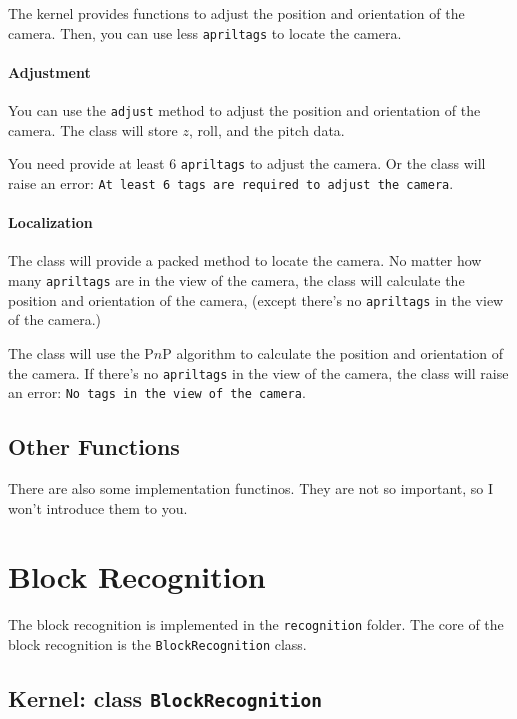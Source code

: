 \documentclass{article}
\begin{document}
The kernel provides functions to adjust the position and orientation of the camera. Then, you can use less \texttt{apriltags} to locate the camera.

\paragraph{Adjustment}

You can use the \texttt{adjust} method to adjust the position and orientation of the camera. The class will store $z$, $\mathrm{roll}$, and the $\mathrm{pitch}$ data.

You need provide at least $6$ \texttt{apriltags} to adjust the camera. Or the class will raise an error: \texttt{At least 6 tags are required to adjust the camera}.

\paragraph{Localization}

The class will provide a packed method to locate the camera. No matter how many \texttt{apriltags} are in the view of the camera, the class will calculate the position and orientation of the camera, (except there's no \texttt{apriltags} in the view of the camera.)

The class will use the P$n$P algorithm to calculate the position and orientation of the camera. If there's no \texttt{apriltags} in the view of the camera, the class will raise an error: \texttt{No tags in the view of the camera}.

\subsection{Other Functions}

There are also some implementation functinos. They are not so important, so I won't introduce them to you.

\section{Block Recognition}

The block recognition is implemented in the \texttt{recognition} folder. The core of the block recognition is the \texttt{BlockRecognition} class.

\subsection{Kernel: class \texttt{BlockRecognition}}
\end{document}
